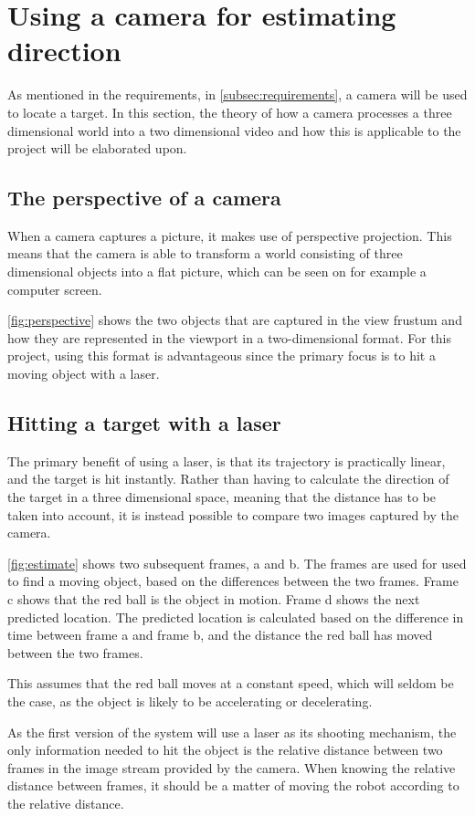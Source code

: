 \section{Using a camera for estimating direction}
As mentioned in the requirements, in \autoref{subsec:requirements}, a camera will be used to locate a target.
In this section, the theory of how a camera processes a three dimensional world into a two dimensional video and how this is applicable to the project will be elaborated upon.

\subsection{The perspective of a camera}
When a camera captures a picture, it makes use of perspective projection.
This means that the camera is able to transform a world consisting of three dimensional objects into a flat picture, which can be seen on for example a computer screen.


\autoref{fig:perspective} shows the two objects that are captured in the view frustum and how they are represented in the viewport in a two-dimensional format.
For this project, using this format is advantageous since the primary focus is to hit a moving object with a laser.

\subsection{Hitting a target with a laser}
The primary benefit of using a laser, is that its trajectory is practically linear, and the target is hit instantly.
Rather than having to calculate the direction of the target in a three dimensional space, meaning that the distance has to be taken into account, it is instead possible to compare two images captured by the camera.

\autoref{fig:estimate} shows two subsequent frames, a and b.
The frames are used for used to find a moving object, based on the differences between the two frames.
Frame c shows that the red ball is the object in motion.
Frame d shows the next predicted location.
The predicted location is calculated based on the difference in time between frame a and frame b, and the distance the red ball has moved between the two frames.

This assumes that the red ball moves at a constant speed, which will seldom be the case, as the object is likely to be accelerating or decelerating.

As the first version of the system will use a laser as its shooting mechanism, the only information needed to hit the object is the relative distance between two frames in the image stream provided by the camera. 
When knowing the relative distance between frames, it should be a matter of moving the robot according to the relative distance.
